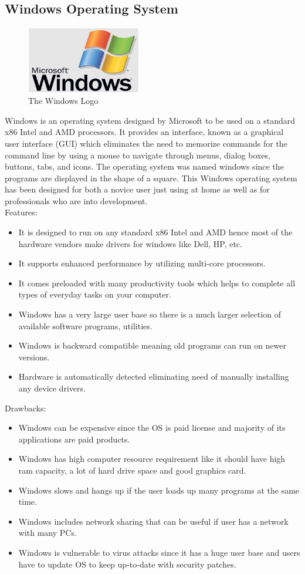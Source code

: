 \documentclass[11pt,a4paper,twoside]{article}
\begin{document}
\subsection{Windows Operating System}
\begin{figure}
\includegraphics[width=5cm]{Fig 4.jpg}
\caption{The Windows Logo}
\end{figure}
Windows is an operating system designed by Microsoft to be used on a standard x86 Intel and AMD processors. It provides an interface, known as a graphical user interface (GUI) which eliminates the need to memorize commands for the command line by using a mouse to navigate through menus, dialog boxes, buttons, tabs, and icons. The operating system was named windows since the programs are displayed in the shape of a square. This Windows operating system has been designed for both a novice user just using at home as well as for professionals who are into development.\\
\newline
Features:
\begin{itemize}
    \item It is designed to run on any standard x86 Intel and AMD hence most of the hardware vendors make drivers for windows like Dell, HP, etc.
\item It supports enhanced performance by utilizing multi-core processors.
\item It comes preloaded with many productivity tools which helps to complete all types of everyday tasks on your computer.
\item Windows has a very large user base so there is a much larger selection of available software programs, utilities.
\item Windows is backward compatible meaning old programs can run on newer versions.
\item Hardware is automatically detected eliminating need of manually installing any device drivers.
\end{itemize}
Drawbacks:
\begin{itemize}
    \item Windows can be expensive since the OS is paid license and majority of its applications are paid products.
\item Windows has high computer resource requirement like it should have high ram capacity, a lot of hard drive space and good graphics card.
\item Windows slows and hangs up if the user loads up many programs at the same time.
\item Windows includes network sharing that can be useful if user has a network with many PCs.
\item Windows is vulnerable to virus attacks since it has a huge user base and users have to update OS to keep up-to-date with security patches.
\end{itemize}
\end{document}

